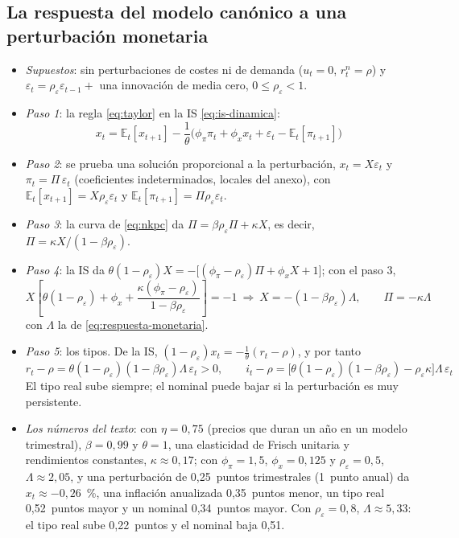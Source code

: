 \documentclass[11pt]{article}
\begin{document}
\subsection*{La respuesta del modelo canónico a una perturbación monetaria}
\begin{itemize}
\item \emph{Supuestos}: sin perturbaciones de costes ni de demanda ($u_t=0$, $r^n_t=\rho$) y $\varepsilon_t=\rho_\varepsilon\varepsilon_{t-1}+$ una innovación de media cero, $0\leq\rho_\varepsilon<1$.
\item \emph{Paso 1}: la regla \eqref{eq:taylor} en la IS \eqref{eq:is-dinamica}:
  \[x_t=\mathbb{E}_t[x_{t+1}]-\frac{1}{\theta}\big(\phi_\pi\pi_t+\phi_x x_t+\varepsilon_t-\mathbb{E}_t[\pi_{t+1}]\big)\]
\item \emph{Paso 2}: se prueba una solución proporcional a la perturbación, $x_t=X\varepsilon_t$ y $\pi_t=\Pi\,\varepsilon_t$ (coeficientes indeterminados, locales del anexo), con $\mathbb{E}_t[x_{t+1}]=X\rho_\varepsilon\varepsilon_t$ y $\mathbb{E}_t[\pi_{t+1}]=\Pi\rho_\varepsilon\varepsilon_t$.
\item \emph{Paso 3}: la curva de  \eqref{eq:nkpc} da $\Pi=\beta\rho_\varepsilon\Pi+\kappa X$, es decir, $\Pi=\kappa X/(1-\beta\rho_\varepsilon)$.
\item \emph{Paso 4}: la IS da $\theta(1-\rho_\varepsilon)X=-\big[(\phi_\pi-\rho_\varepsilon)\Pi+\phi_x X+1\big]$; con el paso 3,
  \[X\left[\theta(1-\rho_\varepsilon)+\phi_x+\frac{\kappa(\phi_\pi-\rho_\varepsilon)}{1-\beta\rho_\varepsilon}\right]=-1\ \Rightarrow\ X=-(1-\beta\rho_\varepsilon)\Lambda,\qquad \Pi=-\kappa\Lambda\]
  con $\Lambda$ la de \eqref{eq:respuesta-monetaria}.
\item \emph{Paso 5}: los tipos. De la IS, $(1-\rho_\varepsilon)x_t=-\frac1\theta(r_t-\rho)$, y por tanto
  \[r_t-\rho=\theta(1-\rho_\varepsilon)(1-\beta\rho_\varepsilon)\Lambda\,\varepsilon_t>0,\qquad i_t-\rho=\big[\theta(1-\rho_\varepsilon)(1-\beta\rho_\varepsilon)-\rho_\varepsilon\kappa\big]\Lambda\,\varepsilon_t\]
  El tipo real sube siempre; el nominal puede bajar si la perturbación es muy persistente.
\item \emph{Los números del texto}: con $\eta=0{,}75$ (precios que duran un año en un modelo trimestral), $\beta=0{,}99$ y $\theta=1$, una elasticidad de Frisch unitaria y rendimientos constantes, $\kappa\approx0{,}17$; con $\phi_\pi=1{,}5$, $\phi_x=0{,}125$ y $\rho_\varepsilon=0{,}5$, $\Lambda\approx2{,}05$, y una perturbación de 0,25~puntos trimestrales (1~punto anual) da $x_t\approx-0{,}26$~\%, una inflación anualizada 0,35~puntos menor, un tipo real 0,52~puntos mayor y un nominal 0,34~puntos mayor. Con $\rho_\varepsilon=0{,}8$, $\Lambda\approx5{,}33$: el tipo real sube 0,22~puntos y el nominal baja 0,51\nocite{Gali2015Monetary}. \findemo
\end{itemize}
\end{document}
